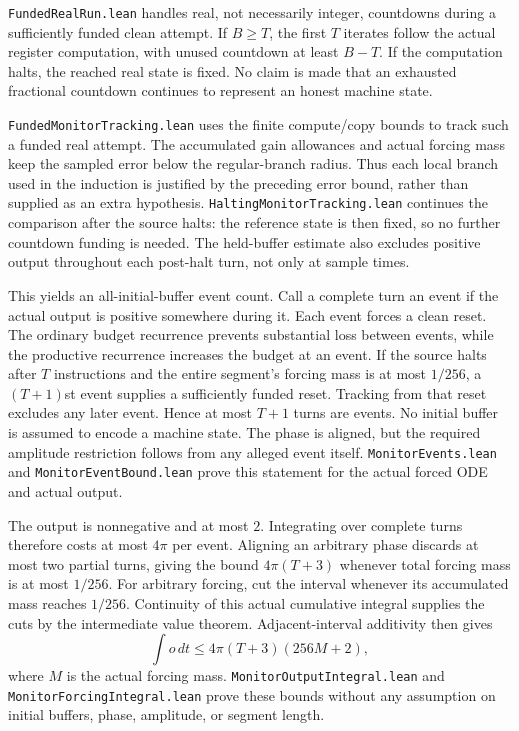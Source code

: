 \documentclass[11pt]{article}
\newcommand{\code}[1]{{\small\nolinkurl{#1}}}
\begin{document}
\code{FundedRealRun.lean} handles real, not necessarily integer,
countdowns during a sufficiently funded clean attempt. If $B\ge T$, the
first $T$ iterates follow the actual register computation, with unused
countdown at least $B-T$. If the computation halts, the reached real
state is fixed. No claim is made that an exhausted fractional countdown
continues to represent an honest machine state.

\code{FundedMonitorTracking.lean} uses the finite compute/copy bounds to
track such a funded real attempt. The accumulated gain allowances and
actual forcing mass keep the sampled error below the regular-branch
radius. Thus each local branch used in the induction is justified by the
preceding error bound, rather than supplied as an extra hypothesis.
\code{HaltingMonitorTracking.lean} continues the comparison after the
source halts: the reference state is then fixed, so no further countdown
funding is needed. The held-buffer estimate also excludes positive output
throughout each post-halt turn, not only at sample times.

This yields an all-initial-buffer event count. Call a complete turn an
event if the actual output is positive somewhere during it. Each event
forces a clean reset. The ordinary budget recurrence prevents substantial
loss between events, while the productive recurrence increases the budget
at an event. If the source halts after $T$ instructions and the entire
segment's forcing mass is at most $1/256$, a $(T+1)$st event supplies a
sufficiently funded reset. Tracking from that reset excludes any later
event. Hence at most $T+1$ turns are events. No initial buffer is assumed
to encode a machine state. The phase is aligned, but the required
amplitude restriction follows from any alleged event itself.
\code{MonitorEvents.lean} and \code{MonitorEventBound.lean} prove this
statement for the actual forced ODE and actual output.

The output is nonnegative and at most $2$. Integrating over complete
turns therefore costs at most $4\pi$ per event. Aligning an arbitrary
phase discards at most two partial turns, giving the bound
$4\pi(T+3)$ whenever total forcing mass is at most $1/256$.
For arbitrary forcing, cut the interval whenever its accumulated mass
reaches $1/256$. Continuity of this actual cumulative integral supplies
the cuts by the intermediate value theorem. Adjacent-interval additivity
then gives
\[
 \int o\,dt\le 4\pi(T+3)(256M+2),
\]
where $M$ is the actual forcing mass.
\code{MonitorOutputIntegral.lean} and \code{MonitorForcingIntegral.lean}
prove these bounds without any assumption on initial buffers, phase,
amplitude, or segment length.
\end{document}
